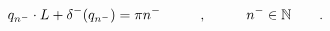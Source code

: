 \begin{equation}
q_{n^-}\cdot L+\delta^-(q_{n^-})=\pi n^- \hspace{1cm},\hspace{1cm}
n^-\in {\Bbb N}\qquad . \label{eq:bouno}
\end{equation}

